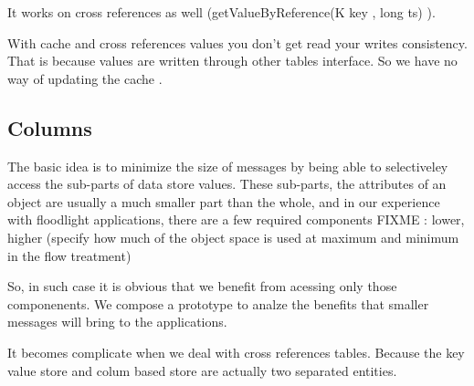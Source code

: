 It works on cross references as well (getValueByReference(K key , long
ts) ). 


With cache and cross references values you don't get read your writes
consistency. That is because values are written through other tables
interface. So we have no way of updating the cache . 

\subsection{Columns}
The basic idea is to minimize the size of messages by being able to
selectiveley access the sub-parts of data store values. These
sub-parts, the attributes of an object are usually a much smaller part
than the whole, and in our experience with floodlight applications,
there are a few required components  FIXME : lower, higher  (specify
how much of the object space is used at maximum and minimum in the
flow treatment)

So, in such case it is obvious that we benefit from acessing only
those componenents. We compose a prototype to analze the benefits
that smaller messages will bring to the applications. 


It becomes complicate when we deal with cross references
tables. Because the key value store and colum based store are actually
two separated entities. 

